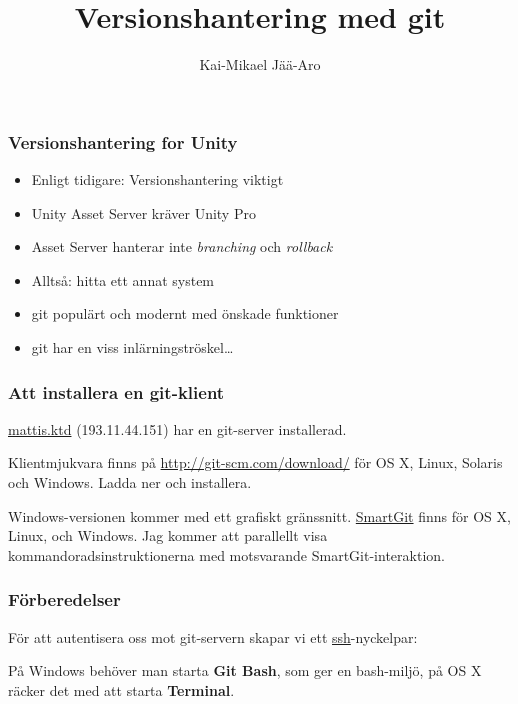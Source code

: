 \documentclass[swedish]{beamer}
\title{Versionshantering med git}
\author{Kai-Mikael Jää-Aro}
\date{}
\newenvironment{dialogue}{%
\VerbatimEnvironment
\begin{Verbatim}[fontsize=\footnotesize,commandchars=\#\(\)]%
}
{%
\end{Verbatim}
}
\begin{document}
\setlength{\intextsep}{0mm}

\begin{frame}
\titlepage
\end{frame}

\begin{frame}
\frametitle{Versionshantering for Unity}
\begin{itemize}
\item Enligt tidigare: Versionshantering viktigt
\item Unity Asset Server kräver Unity Pro
\item Asset Server hanterar inte \emph{branching} och \emph{rollback}
\item Alltså: hitta ett annat system
\item git populärt och modernt med önskade funktioner
\item git har en viss inlärningströskel\dots
\end{itemize}
\end{frame}

\begin{frame}
\frametitle{Att installera en git-klient}
\url{mattis.ktd} (193.11.44.151) har en git-server installerad.

Klientmjukvara finns på \url{http://git-scm.com/download/} för OS X, Linux, Solaris och Windows.  Ladda ner och installera.

Windows-versionen kommer med ett grafiskt gränssnitt.  \href{http://www.syntevo.com/smartgit/download}{SmartGit} finns för OS X, Linux, och Windows. Jag kommer att parallellt visa kommandoradsinstruktionerna med motsvarande SmartGit-interaktion.

\end{frame}

\begin{frame}[fragile]
\frametitle{Förberedelser}
För att autentisera oss mot git-servern skapar vi ett \href{http://www.openssh.com/}{ssh}-nyckelpar:

På Windows behöver man starta \textbf{Git Bash}, som ger en bash-miljö, på OS X räcker det med att starta \textbf{Terminal}.
\end{frame}

\end{document}
